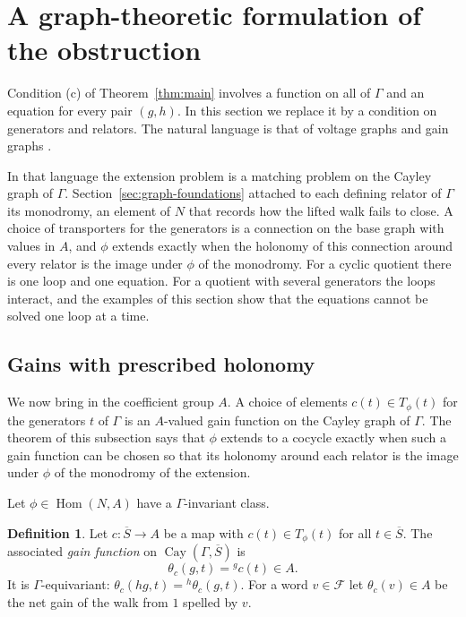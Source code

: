 \documentclass[12pt,letterpaper]{article}
\numberwithin{equation}{section}
\theoremstyle{plain}
\theoremstyle{definition}
\newtheorem{definition}[theorem]{Definition}
\newcommand{\act}[2]{{}^{#1}\!#2}          %
\newcommand{\fr}{\mathcal{F}}             %
\DeclareMathOperator{\Hom}{Hom}
\DeclareMathOperator{\Cay}{Cay}
\begin{document}
\section{A graph-theoretic formulation of the obstruction}\label{sec:graph}

Condition (c) of Theorem~\ref{thm:main} involves a function on all of
$\Gamma$ and an equation for every pair $(g,h)$. In this section we
replace it by a condition on generators and relators. The natural language
is that of voltage graphs \cite{GT87} and gain graphs \cite{Za89}.

In that language the extension problem is a matching problem on the
Cayley graph of $\Gamma$. Section~\ref{sec:graph-foundations} attached
to each defining relator of $\Gamma$ its monodromy, an element of $N$
that records how the lifted walk fails to close. A choice of
transporters for the generators is a connection on the base graph with
values in $A$, and $\phi$ extends exactly when the holonomy of this
connection around every relator is the image under $\phi$ of the
monodromy. For a cyclic quotient there is one loop and one equation. For
a quotient with several generators the loops interact, and the examples
of this section show that the equations cannot be solved one loop at a
time.

\subsection{Gains with prescribed holonomy}

We now bring in the coefficient group $A$. A choice of elements
$c(t)\in T_\phi(t)$ for the generators $t$ of $\Gamma$ is an $A$-valued
gain function on the Cayley graph of $\Gamma$. The theorem of this
subsection says that $\phi$ extends to a cocycle exactly when such a gain
function can be chosen so that its holonomy around each relator is the
image under $\phi$ of the monodromy of the extension.

Let $\phi\in\Hom(N,A)$ have a $\Gamma$-invariant class.

\begin{definition}\label{def:gain}
Let $c:\overline{S}\to A$ be a map with $c(t)\in T_\phi(t)$ for all
$t\in\overline{S}$. The associated \emph{gain function} on
$\Cay(\Gamma,\overline{S})$ is
\[
\theta_c(g,t)=\act{g}{c(t)}\in A .
\]
It is $\Gamma$-equivariant: $\theta_c(hg,t)=\act{h}{\theta_c(g,t)}$. For a
word $v\in\fr$ let $\theta_c(v)\in A$ be the net gain of the walk from $1$
spelled by $v$.
\end{definition}
\end{document}
